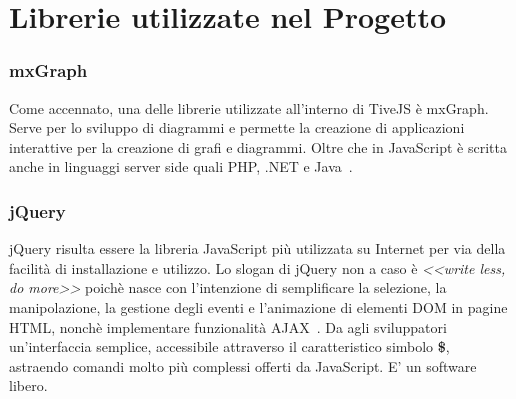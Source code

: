         \section{Librerie utilizzate nel Progetto}
            \subsubsection{mxGraph}
                Come accennato, una delle librerie utilizzate all'interno di TiveJS è mxGraph. Serve per lo sviluppo di diagrammi e permette la creazione di applicazioni interattive per la creazione di grafi e diagrammi. Oltre che in JavaScript è scritta anche in linguaggi server side quali PHP, .NET e Java~\cite{mxgraph}.
            \subsubsection{jQuery}
                jQuery risulta essere la libreria JavaScript più utilizzata su Internet per via della facilità di installazione e utilizzo.
                \newline
                Lo slogan di jQuery non a caso è \textit{<<write less, do more>>} poichè nasce con l'intenzione di semplificare la selezione, la manipolazione, la gestione degli eventi e l'animazione di elementi DOM in pagine HTML, nonchè implementare funzionalità AJAX~\cite{jquery}.
                \newline
                Da agli sviluppatori un'interfaccia semplice, accessibile attraverso il caratteristico simbolo \textbf{\$}, astraendo comandi molto più complessi offerti da JavaScript. E' un software libero.